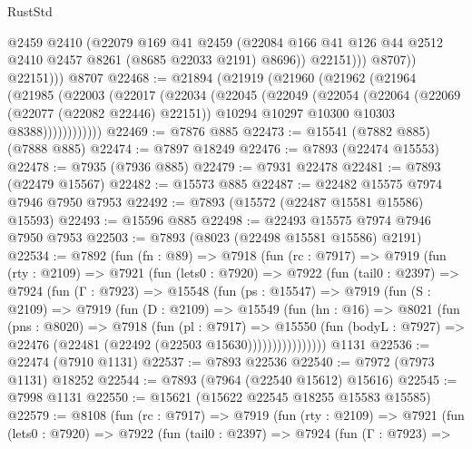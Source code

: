 \begin{lexlean}{RustStd}
\begin{coremodule}
                    @2459
                    @2410
                    (@22079
                      @169
                      @41
                      @2459
                      (@22084 @166 @41 @126 @44 @2512 @2410 @2457 @8261 (@8685 @22033 @2191) @8696))
                    @22151)))
              @8707))
          @22151)))
    @8707
@22468 := @21894
    (@21919
      (@21960
        (@21962
          (@21964
            (@21985
              (@22003
                (@22017
                  (@22034
                    (@22045
                      (@22049
                        (@22054
                          (@22064
                            (@22069 (@22077 (@22082 @22446) @22151))
                            @10294
                            @10297
                            @10300
                            @10303
                            @8388))))))))))))
@22469 := @7876 @885
@22473 := @15541 (@7882 @885) (@7888 @885)
@22474 := @7897 @18249
@22476 := @7893 (@22474 @15553)
@22478 := @7935 (@7936 @885)
@22479 := @7931 @22478
@22481 := @7893 (@22479 @15567)
@22482 := @15573 @885
@22487 := @22482 @15575 @7974 @7946 @7950 @7953
@22492 := @7893 (@15572 (@22487 @15581 @15586) @15593)
@22493 := @15596 @885
@22498 := @22493 @15575 @7974 @7946 @7950 @7953
@22503 := @7893 (@8023 (@22498 @15581 @15586) @2191)
@22534 := @7892
    (fun (fn : @89) =>
    @7918
      (fun (rc : @7917) =>
      @7919
        (fun (rty : @2109) =>
        @7921
          (fun (lets0 : @7920) =>
          @7922
            (fun (tail0 : @2397) =>
            @7924
              (fun (Γ : @7923) =>
              @15548
                (fun (ps : @15547) =>
                @7919
                  (fun (S : @2109) =>
                  @7919
                    (fun (D : @2109) =>
                    @15549
                      (fun (hn : @16) =>
                      @8021
                        (fun (pns : @8020) =>
                        @7918
                          (fun (pl : @7917) =>
                          @15550
                            (fun (bodyL : @7927) =>
                            @22476 (@22481 (@22492 (@22503 @15630))))))))))))))))
    @1131
@22536 := @22474 (@7910 @1131)
@22537 := @7893 @22536
@22540 := @7972 (@7973 @1131) @18252
@22544 := @7893 (@7964 (@22540 @15612) @15616)
@22545 := @7998 @1131
@22550 := @15621 (@15622 @22545 @18255 @15583 @15585)
@22579 := @8108
    (fun (rc : @7917) =>
    @7919
      (fun (rty : @2109) =>
      @7921
        (fun (lets0 : @7920) =>
        @7922
          (fun (tail0 : @2397) =>
          @7924
            (fun (Γ : @7923) =>

\end{coremodule}
\end{lexlean}
